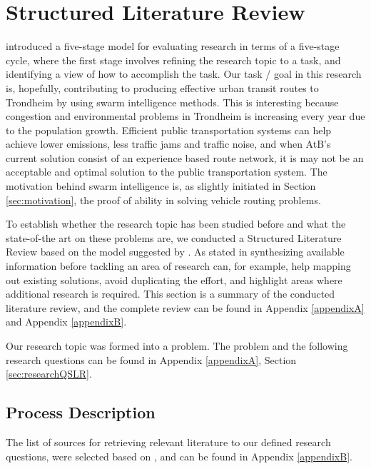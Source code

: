 \section{Structured Literature Review}
\label{sec:structuredLiteratureReview}

\citet{cohen88} introduced a five-stage model for evaluating research in terms of a five-stage cycle, where the first stage involves refining the research topic to a task, and identifying a view of how to accomplish the task. Our task / goal in this research is, hopefully, contributing to producing effective urban transit routes to Trondheim by using swarm intelligence methods. This is interesting because congestion and environmental problems in Trondheim is increasing every year due to the population growth\citep{website:miljopakken}. Efficient public transportation systems can help achieve lower emissions, less traffic jams and traffic noise, and when AtB's\citet{website:atb} current solution consist of an experience based route network, it is may not be an acceptable and optimal solution to the public transportation system. The motivation behind swarm intelligence is, as slightly initiated in Section \ref{sec:motivation}, the proof of ability in solving vehicle routing problems. 

To establish whether the research topic has been studied before and what the state-of-the art on these problems are, we conducted a Structured Literature Review based on the model suggested by \citet{kofod2014}. As stated in \citep{kofod2014} synthesizing available information before tackling an area of research can, for example, help mapping out existing solutions, avoid duplicating the effort, and highlight areas where additional research is required. This section is a summary of the conducted literature review, and the complete review can be found in Appendix \vref{appendixA} and Appendix \vref{appendixB}. 

Our research topic was formed into a problem. The problem and the following research questions can be found in Appendix \ref{appendixA}, Section \vref{sec:researchQSLR}. %

\subsection{Process Description}
The list of sources for retrieving relevant literature to our defined research questions, were selected based on \citep[p.3]{kofod2014}, and can be found in Appendix \vref{appendixB}. 

